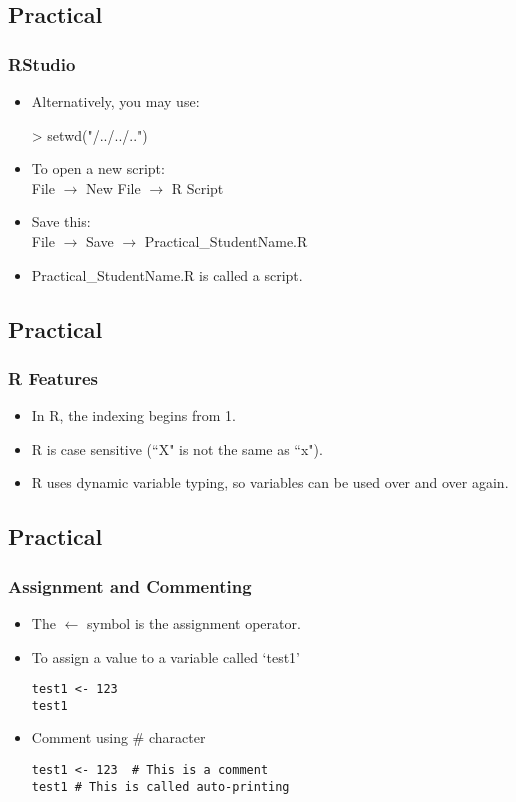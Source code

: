 \documentclass[11pt]{beamer}
\begin{document}
\subsection{Practical}
\begin{frame}
\frametitle{{\sf R}Studio}
\begin{itemize}
\item Alternatively, you may use: 
\begin{semiverbatim}
> setwd("/../../..") 
\end{semiverbatim}
\vspace{0.1in}
\item {To open a new script: \\
File $\rightarrow$ New File $\rightarrow$  R Script}
\vspace{0.1in}
\item {Save this: \\
File $\rightarrow$ Save $\rightarrow$ Practical\_StudentName.R}
\vspace{0.1in}
\item Practical\_StudentName.R is called a script. 
\end{itemize}
\end{frame}

\subsection{Practical}
\begin{frame}[fragile]
\frametitle{{\sf R} Features}
\begin{itemize}
\item In {\sf R}, the indexing begins from 1.
\vspace{0.1in}
\item {\sf R} is case sensitive (``X" is not the same as ``x").
\vspace{0.1in}
\item {\sf R} uses dynamic variable typing, so variables can be used over and over again.
\end{itemize}
\end{frame}

\subsection{Practical}
\begin{frame}[fragile]
\frametitle{Assignment and Commenting}
\begin{itemize}
\item The $\leftarrow$ symbol is the assignment operator.
\vspace{0.1in}
\item To assign a value to a variable called `test1'
\begin{verbatim}
test1 <- 123 
test1
\end{verbatim}
\vspace{0.1in}
\item Comment using \# character 
\begin{verbatim}
test1 <- 123  # This is a comment 
test1 # This is called auto-printing
\end{verbatim}
\end{itemize}
\end{frame}
\end{document}
